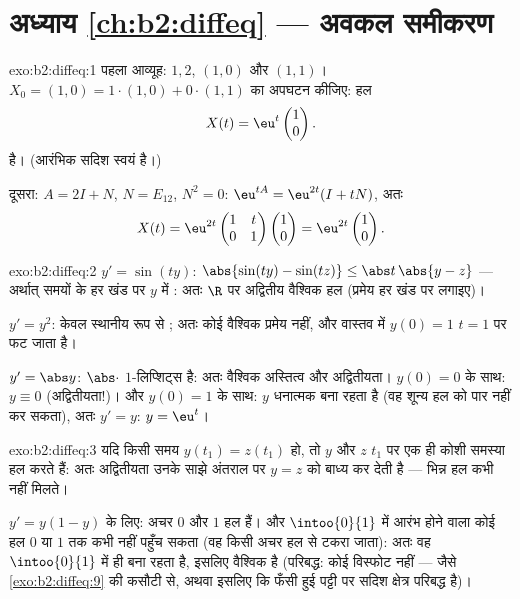 \section*{अध्याय \ref{ch:b2:diffeq} --- अवकल समीकरण}

\begin{solution}{exo:b2:diffeq:1}
पहला आव्यूह:  $1, 2$,  $(1,0)$ और $(1,1)$। $X_0 = (1,0) = 1\cdot(1,0) + 0\cdot(1,1)$ का अपघटन
कीजिए: हल
\[
X(t) = \eu^{t}\begin{pmatrix}1\\ 0\end{pmatrix} .
\]
है। (आरंभिक सदिश स्वयं  है।)

दूसरा: $A = 2I + N$, $N = E_{12}$, $N^2 = 0$: $\eu^{tA} =
\eu^{2t}(I + tN)$, अतः
\[
X(t) = \eu^{2t}\begin{pmatrix} 1 & t\\ 0 & 1\end{pmatrix}
\begin{pmatrix}1\\ 0\end{pmatrix}
= \eu^{2t}\begin{pmatrix}1\\ 0\end{pmatrix}.
\]
\end{solution}

\begin{solution}{exo:b2:diffeq:2}
$y' = \sin(ty)$: $\abs{\sin(ty) - \sin(tz)} \leq \abs t\,\abs{y -
z}$ --- अर्थात् समयों के हर खंड पर  $y$ में :
अतः $\R$ पर अद्वितीय वैश्विक हल (प्रमेय हर खंड पर लगाइए)।

$y' = y^2$: केवल स्थानीय रूप से ; अतः कोई वैश्विक प्रमेय नहीं, और वास्तव
में $y(0) = 1$ $t = 1$ पर फट जाता है।

$y' = \abs y$: $\abs\cdot$ $1$-लिप्शिट्स है: अतः वैश्विक अस्तित्व और अद्वितीयता। $y(0) = 0$ के
साथ: $y \equiv 0$ (अद्वितीयता!)। और $y(0)
= 1$ के साथ: $y$ धनात्मक बना रहता है (वह शून्य
हल को पार नहीं कर सकता), अतः $y' =
y$: $y = \eu^t$।
\end{solution}

\begin{solution}{exo:b2:diffeq:3}
यदि किसी समय $y(t_1) = z(t_1)$ हो, तो $y$ और $z$ $t_1$ पर एक ही कोशी समस्या हल करते हैं:
अतः अद्वितीयता उनके साझे अंतराल पर $y = z$ को बाध्य कर देती है --- भिन्न हल
कभी नहीं मिलते।

$y' = y(1-y)$ के लिए: अचर $0$ और $1$ हल हैं। और $\intoo{0}{1}$ में आरंभ होने वाला कोई हल $0$
या $1$ तक कभी नहीं पहुँच सकता (वह किसी अचर हल से टकरा जाता): अतः वह $\intoo{0}{1}$ में
ही बना रहता है, इसलिए वैश्विक है (परिबद्ध: कोई विस्फोट नहीं --- जैसे \cref{exo:b2:diffeq:9}
की कसौटी से, अथवा इसलिए कि फँसी हुई पट्टी पर सदिश क्षेत्र परिबद्ध है)।
\end{solution}

